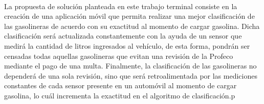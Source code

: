 \paragraph{}
La propuesta de solución planteada en este trabajo terminal consiste en la creación de una aplicación móvil que permita realizar una mejor clasificación de las gasolineras de acuerdo con su exactitud al momento de cargar gasolina. Dicha clasificación será actualizada constantemente con la ayuda de un sensor que medirá la cantidad de litros ingresados al vehículo, de esta forma, pondrán ser censadas todas aquellas gasolineras que evitan una revisión de la Profeco mediante el pago de una multa. Finalmente, la clasificación de las gasolineras no dependerá de una sola revisión, sino que será retroalimentada por las mediciones constantes de cada sensor presente en un automóvil al momento de cargar gasolina, lo cuál incrementa la exactitud en el algoritmo de clasificación.p